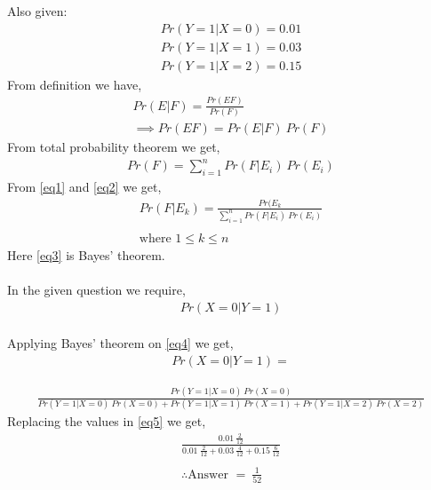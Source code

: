 \documentclass[journal,12pt,twocolumn]{IEEEtran}
\begin{document}
Also given: \\
\begin{align}
    Pr(Y=1|X=0) = 0.01 \\
    Pr(Y=1|X=1) = 0.03 \\
    Pr(Y=1|X=2) = 0.15
\end{align}
From definition we have,
\begin{align}
    Pr(E|F) = \frac{Pr(EF)}{Pr(F)}\\
    \implies Pr(EF) = Pr(E|F)\:Pr(F) \label{eq1}
\end{align}
From total probability theorem we get,
\begin{align}
    Pr(F) = \sum_{i=1}^n Pr(F|E_{i})\:Pr(E_{i}) \label{eq2}
\end{align}
From \ref{eq1} and \ref{eq2} we get,
\begin{align}
    Pr(F|E_{k}) = \frac{Pr(E_{k}}{\sum_{i=1}^n Pr(F|E_{i})\:Pr(E_{i})} \label{eq3}\\
    \nonumber\\
    \text{where }  1\leq k\leq n \nonumber
\end{align}
Here \ref{eq3} is Bayes' theorem.\\ \\
In the given question we require,
\begin{align}
    Pr(X=0|Y=1) \label{eq4}
\end{align}
\\Applying Bayes' theorem on \ref{eq4} we get,
\scriptsize
\begin{align}
    Pr(X=0|Y=1) = \nonumber
\end{align}

\begin{align}
    \frac{Pr(Y=1|X=0)\:Pr(X=0)}{Pr(Y=1|X=0)\:Pr(X=0)+Pr(Y=1|X=1)\:Pr(X=1)+Pr(Y=1|X=2)\:Pr(X=2)}\label{eq5}
\end{align}
\normalsize
Replacing the values in \ref{eq5} we get,
\begin{align}
    \frac{0.01\:\frac{2}{12}}{0.01\:\frac{2}{12}+0.03\:\frac{4}{12}+0.15\:\frac{6}{12}}\\
    \nonumber\\
    \therefore \text{Answer }= \:\frac{1}{52}
\end{align}
\end{document}
